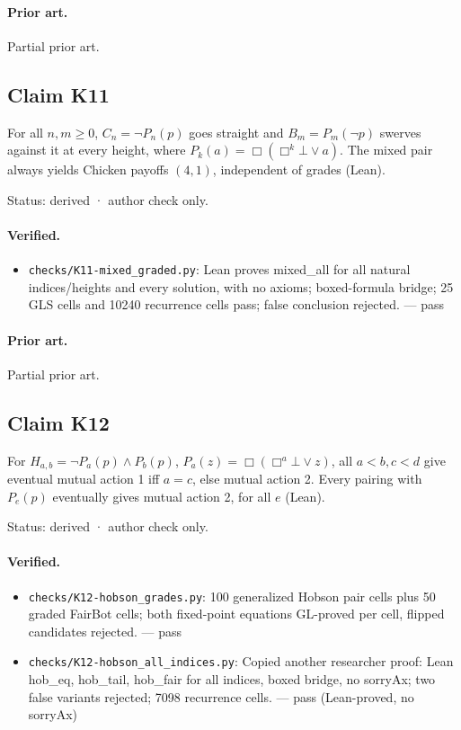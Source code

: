 \documentclass{article}
\begin{document}
\paragraph{Prior art.} Partial prior art.

\subsection*{Claim K11}

For all $n,m\ge0$, $C_n=\neg P_n(p)$ goes straight and $B_m=P_m(\neg p)$ swerves against it at every height, where $P_k(a)=\Box(\Box^k\bot\lor a)$. The mixed pair always yields Chicken payoffs $(4,1)$, independent of grades (Lean).

Status: derived · author check only.

\paragraph{Verified.}
\begin{itemize}
\item \texttt{checks/K11-mixed\_graded.py}: Lean proves mixed\_all for all natural indices/heights and every solution, with no axioms; boxed-formula bridge; 25 GLS cells and 10240 recurrence cells pass; false conclusion rejected. --- pass
\end{itemize}

\paragraph{Prior art.} Partial prior art.

\subsection*{Claim K12}

For $H_{a,b}=\neg P_a(p)\land P_b(p)$, $P_a(z)=\Box(\Box^a\bot\lor z)$, all $a<b,c<d$ give eventual mutual action 1 iff $a=c$, else mutual action 2. Every pairing with $P_e(p)$ eventually gives mutual action 2, for all $e$ (Lean).

Status: derived · author check only.

\paragraph{Verified.}
\begin{itemize}
\item \texttt{checks/K12-hobson\_grades.py}: 100 generalized Hobson pair cells plus 50 graded FairBot cells; both fixed-point equations GL-proved per cell, flipped candidates rejected. --- pass
\item \texttt{checks/K12-hobson\_all\_indices.py}: Copied another researcher proof: Lean hob\_eq, hob\_tail, hob\_fair for all indices, boxed bridge, no sorryAx; two false variants rejected; 7098 recurrence cells. --- pass (Lean-proved, no sorryAx)
\end{itemize}
\end{document}
